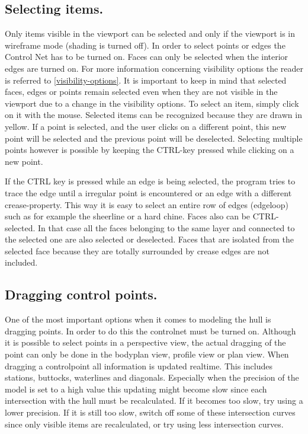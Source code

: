 \documentclass[12pt]{article}
\begin{document}
\subsection{Selecting items.}
Only items visible in the viewport can be selected and only if the
viewport is in wireframe mode (shading is turned off). In order to
select points or edges the Control Net has to be
turned on. Faces can only be selected when
the interior edges are turned on. For more
information concerning visibility options the reader is referred
to \ref{visibility-options}. It is important to keep in mind that
selected faces, edges or points remain selected even when they are not
visible in the viewport due to a change in the visibility options. To
select an item, simply click on it with the mouse. Selected items can
be recognized because they are drawn in yellow. If a point is
selected, and the user clicks on a different point, this new point
will be selected and the previous point will be deselected.  Selecting
multiple points however is possible by keeping the CTRL-key pressed
while clicking on a new point.

If the CTRL key is pressed while an edge is being selected, the
program tries to trace the edge until a irregular point is encountered
or an edge with a different crease-property. This way it is easy to
select an entire row of edges (edgeloop) such as for example the
sheerline or a hard chine.  Faces also can be CTRL-selected. In that
case all the faces belonging to the same layer and connected to the
selected one are also selected or deselected. Faces that are isolated
from the selected face because they are totally surrounded by crease
edges are not included.

\subsection{Dragging control points.}
One of the most important options when it comes to modeling the hull
is dragging points. In order to do this the controlnet must be turned
on. Although it is possible to select points in a perspective view,
the actual dragging of the point can only be done in the bodyplan
view, profile view or plan view. When dragging a controlpoint all
information is updated realtime. This includes stations, buttocks,
waterlines and diagonals. Especially when the precision of the model
is set to a high value this updating might become slow since each
intersection with the hull must be recalculated. If it becomes too
slow, try using a lower precision. If it is still too slow, switch off
some of these intersection curves since only visible items are
recalculated, or try using less intersection curves.
\end{document}
